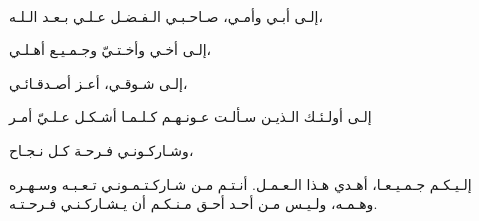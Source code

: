 \ \vfill{}
\begin{center}
    {
        \Large\bfseries
    }
\end{center}

\begin{RLtext}
    إلـى أبـي وأمـي، صـاحـبـي الـفـضـل عـلـي بـعـد الـلـه،
    
    إلـى أخـي وأخـتـيّ وجـمـيـع أهـلـي،

    إلـى شـوقـي، أعـز أصـدقـائـي،
    
    إلـى أولـئـك الـذيـن سـألـت عـونـهـم كـلـمـا أشـكـل عـلـيّ أمـر
    
    وشـاركـونـي فـرحـة كـل نـجـاح،
    
    إلـيـكـم جـمـيـعـا، أهـدي هـذا الـعـمـل.
    أنـتـم مـن شـاركـتـمـونـي تـعـبـه وسـهـره وهـمـه،
    ولـيـس مـن أحـد أحـق مـنـكـم أن يـشـاركـنـي فـرحـتـه.
\end{RLtext}

\vfill{}
\pagebreak